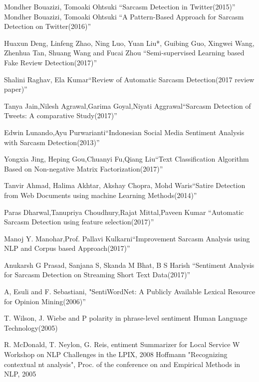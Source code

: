 \documentclass[oneside,a4paper,12pt]{book}
\begin{document}
\begin{thebibliography}{99}
 
\bibitem{} Mondher Bouazizi, Tomoaki Ohtsuki \textquotedblleft Sarcasm Detection in Twitter(2015)\textquotedblright\
\bibitem{} Mondher Bouazizi, Tomoaki Ohtsuki \textquotedblleft A Pattern-Based Approach for Sarcasm Detection on Twitter(2016)\textquotedblright\

\bibitem{} Huaxun Deng, Linfeng Zhao, Ning Luo, Yuan Liu*, Guibing Guo, Xingwei Wang, Zhenhua Tan, Shuang Wang and Fucai Zhou \textquotedblleft Semi-supervised Learning based Fake Review Detection(2017)\textquotedblright\

\bibitem{} Shalini Raghav, Ela Kumar\textquotedblleft Review of Automatic Sarcasm Detection(2017 review paper)\textquotedblright\

\bibitem{} Tanya Jain,Nilesh Agrawal,Garima Goyal,Niyati Aggrawal\textquotedblleft Sarcasm Detection of Tweets: A comparative Study(2017)\textquotedblright\

\bibitem{} Edwin Lunando,Ayu Purwarianti\textquotedblleft Indonesian Social Media Sentiment Analysis with Sarcasm Detection(2013)\textquotedblright\

\bibitem{} Yongxia Jing, Heping Gou,Chuanyi Fu,Qiang Liu\textquotedblleft Text Classification Algorithm Based on Non-negative Matrix Factorization(2017)\textquotedblright\

\bibitem{} Tanvir Ahmad, Halima Akhtar, Akshay Chopra, Mohd Waris\textquotedblleft Satire Detection from Web Documents using machine Learning Methods(2014)\textquotedblright\

\bibitem{}Paras Dharwal,Tanupriya Choudhury,Rajat Mittal,Paveen Kumar \textquotedblleft Automatic Sarcasm Detection using feature selection(2017)\textquotedblright\

\bibitem{} Manoj Y. Manohar,Prof. Pallavi Kulkarni\textquotedblleft Improvement Sarcasm Analysis using NLP and Corpus based Approach(2017)\textquotedblright\

\bibitem{}  Anukarsh G Prasad, Sanjana S, Skanda M Bhat, B S Harish \textquotedblleft Sentiment Analysis for Sarcasm Detection on Streaming Short Text Data(2017)\textquotedblright\

\bibitem{} A, Esuli and F. Sebastiani, "SentiWordNet: A Publicly Available Lexical Resource for Opinion Mining(2006)\textquotedblright\

\bibitem{} T. Wilson, J. Wiebe and P
polarity in phrase-level sentiment
Human Language Technology(2005)

\bibitem{} R. McDonald, T. Neylon, G. Reis,
entiment Summarizer for Local Service
W Workshop on NLP Challenges in the
LPIX, 2008
\bibitem{} Hoffmann "Recognizing contextual
nt analysis", Proc. of the conference on
and Empirical Methods in NLP, 2005
\end{thebibliography}
\end{document}
